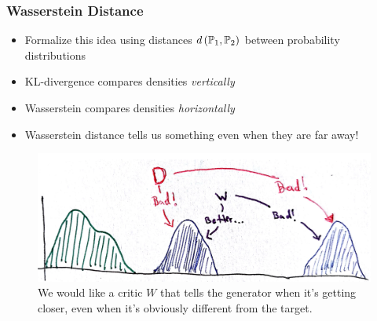 \documentclass[10pt,mathserif]{beamer}
\begin{document}
\begin{frame}
  \frametitle{Wasserstein Distance}
 \begin{itemize}
 \item Formalize this idea using distances $d\left(\P_1, \P_2\right)$ between
   probability distributions
 \item KL-divergence compares densities \textit{vertically}
 \item Wasserstein compares densities \textit{horizontally}
 \item Wasserstein distance tells us something even when they are far away!
\end{itemize}
\begin{figure}[ht]
  \centering
  \includegraphics[width=0.7\paperwidth]{figure/alternative_critic}
  \caption{We would like a critic $W$ that tells the generator when it's getting
    closer, even when it's obviously different from the
    target. \label{fig:alternative_critic} }
\end{figure}
\end{frame}
\end{document}
